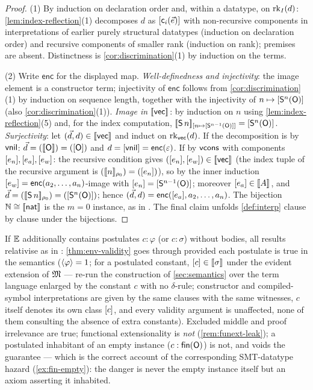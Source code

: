 \begin{proof}
(1) By induction on declaration order and, within a datatype, on
$\mathrm{rk}_{I}(d)$: \cref{lem:index-reflection}(1) decomposes $d$ as
$[\mathsf{c}_i(\vec{e})]$ with non-recursive components in
interpretations of earlier purely structural datatypes (induction on
declaration order) and recursive components of smaller rank (induction
on rank); premises are absent.  Distinctness is
\cref{cor:discrimination}(1) by induction on the terms.

(2) Write $\mathsf{enc}$ for the displayed map.  \emph{Well-definedness
and injectivity}: the image element is a constructor term; injectivity
of $\mathsf{enc}$ follows from \cref{cor:discrimination}(1) by
induction on sequence length, together with the injectivity of $n
\mapsto [\mathsf{S}^n(\mathsf{O})]$ (also \cref{cor:discrimination}(1)).
\emph{Image in $[\![ \mathsf{vec} ]\!]_{}$}: by induction on $n$ using
\cref{lem:index-reflection}(5) and, for the index computation,
$[\![ \mathsf{S}\,n ]\!]_{[n \mapsto [\mathsf{S}^{n-1}(\mathsf{O})]]} =
[\mathsf{S}^n(\mathsf{O})]$.  \emph{Surjectivity}: let $(\vec{d}, d) \in
[\![ \mathsf{vec} ]\!]_{}$ and induct on $\mathrm{rk}_{\mathsf{vec}}(d)$.  If the decomposition
is by $\mathsf{vnil}$: $\vec{d} = ([\![ \mathsf{O} ]\!]) = ([\mathsf{O}])$ and $d =
[\mathsf{vnil}] = \mathsf{enc}(\varepsilon)$.  If by $\mathsf{vcons}$ with
components $[e_n], [e_a], [e_w]$: the recursive condition
gives $([e_n], [e_w]) \in [\![ \mathsf{vec} ]\!]_{}$ (the index tuple of
the recursive argument is $([\![ n ]\!]_{\rho_0}) = ([e_n])$), so by
the inner induction $[e_w] = \mathsf{enc}(a_2, \dots,
a_n)$-image with $[e_n] = [\mathsf{S}^{n-1}(\mathsf{O})]$; moreover
$[e_a] \in [\![ A ]\!]_{}$, and $\vec{d} = ([\![ \mathsf{S}\,n ]\!]_{\rho_0}) =
([\mathsf{S}^{n}(\mathsf{O})])$; hence $(\vec{d}, d) =
\mathsf{enc}([e_a], a_2, \dots, a_n)$.  The bijection $\mathbb{N} \cong [\![ \mathsf{nat} ]\!]_{}$ is the
$m = 0$ instance, as in \cite{Extraction2026}.  The final claim unfolds
\cref{def:interp} clause by clause under the bijections.
\end{proof}

\begin{remark}
\label{rem:axioms}
If $\mathbb{E}$ additionally contains postulates $c : \varphi$ (or $c :
\sigma$) without bodies, all results relativise as in
\cite{Extraction2026}: \cref{thm:env-validity} goes through
provided each postulate is true in the semantics ($\langle \varphi \rangle = 1$;
for a postulated constant, $[c] \in [\![ \sigma ]\!]_{}$ under the
evident extension of $\mathfrak{M}$ --- re-run the construction of
\cref{sec:semantics} over the term language enlarged by the constant
$c$ with no $\delta$-rule; constructor and compiled-symbol
interpretations are given by the same clauses with the same witnesses,
$c$ itself denotes its own class $[c]$, and every validity
argument is unaffected, none of them consulting the absence of extra
constants).  Excluded middle and proof irrelevance are
true; functional extensionality is \emph{not}
(\cref{rem:funext-leak}); a postulated inhabitant of an empty instance
($c : \mathsf{fin}(\mathsf{O})$) is not, and voids the guarantee --- which is the
correct account of the corresponding SMT-datatype hazard
(\cref{ex:fin-empty}): the danger is never the empty instance itself
but an axiom asserting it inhabited.
\end{remark}

